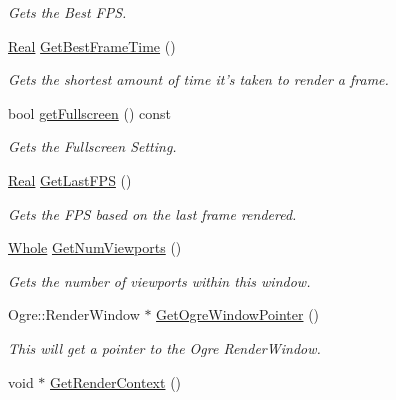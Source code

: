 \begin{DoxyCompactItemize}
\begin{DoxyCompactList}\small\item\em Gets the Best FPS. \item\end{DoxyCompactList}\item 
\hyperlink{namespacephys_af7eb897198d265b8e868f45240230d5f}{Real} \hyperlink{classphys_1_1GameWindow_a128723e10c8a3ab778b30da38d351fc4}{GetBestFrameTime} ()
\begin{DoxyCompactList}\small\item\em Gets the shortest amount of time it's taken to render a frame. \item\end{DoxyCompactList}\item 
bool \hyperlink{classphys_1_1GameWindow_a05ab7d5525e73f5eecf1f6ef6d3598ab}{getFullscreen} () const 
\begin{DoxyCompactList}\small\item\em Gets the Fullscreen Setting. \item\end{DoxyCompactList}\item 
\hyperlink{namespacephys_af7eb897198d265b8e868f45240230d5f}{Real} \hyperlink{classphys_1_1GameWindow_ab2b0d9150f394aa1b71f001768c6b011}{GetLastFPS} ()
\begin{DoxyCompactList}\small\item\em Gets the FPS based on the last frame rendered. \item\end{DoxyCompactList}\item 
\hyperlink{namespacephys_a460f6bc24c8dd347b05e0366ae34f34a}{Whole} \hyperlink{classphys_1_1GameWindow_a4b97aaa248a2382b78520b1623dc2978}{GetNumViewports} ()
\begin{DoxyCompactList}\small\item\em Gets the number of viewports within this window. \item\end{DoxyCompactList}\item 
Ogre::RenderWindow $\ast$ \hyperlink{classphys_1_1GameWindow_ad94dbdf063bd5dd9a285a7803928aede}{GetOgreWindowPointer} ()
\begin{DoxyCompactList}\small\item\em This will get a pointer to the Ogre RenderWindow. \item\end{DoxyCompactList}\item 
void $\ast$ \hyperlink{classphys_1_1GameWindow_ad2d4163536db5b6e61147c5acf3d5b4f}{GetRenderContext} ()

\end{DoxyCompactItemize}
